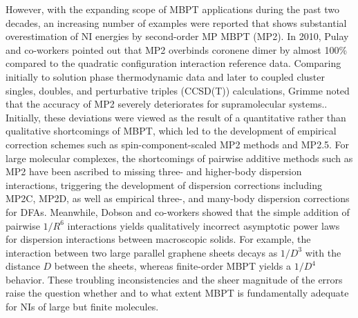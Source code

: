 \documentclass[journal=jctcce,manuscript=article]{achemso}
\begin{document}
However, with the expanding scope of MBPT applications during the past
two decades, an increasing number of examples were reported that shows
substantial overestimation of NI energies by second-order MP MBPT (MP2).\cite{doi:10.1002/wcms.84}
In 2010, Pulay and co-workers pointed out that MP2 overbinds coronene dimer
by almost 100\% compared to the quadratic configuration interaction reference
data.\cite{doi:10.1080/00268970903397249,doi:10.1007/s00214-011-1009-6}
Comparing initially to solution phase thermodynamic
data\cite{Grimme06JComputChem27p1787} and later to coupled cluster singles, doubles,
and perturbative triples (CCSD(T)) calculations,\cite{doi:10.1063/1.3382344}
Grimme noted  that the accuracy of MP2 severely deteriorates for supramolecular
systems.\cite{Grimme12ChemEurJ18p9955}. Initially, these deviations
were viewed as the result of a quantitative rather than qualitative 
shortcomings of MBPT, which led to the development of empirical correction
schemes such as spin-component-scaled MP2 methods\cite{Grimme03JChemPhys118p9095,doi:10.1063/1.1809602}
and MP2.5.\cite{doi:10.1002/cphc.200800718} For large molecular complexes,
the shortcomings of pairwise additive methods such as MP2 have been ascribed
to missing three- and higher-body dispersion interactions,\cite{Grimme12ChemEurJ18p9955}
triggering the development of dispersion corrections including MP2C,
\cite{doi:10.1063/1.2905808,Pitonak10JChemTheoryComput6p168,doi:10.1063/1.4809981}
MP2D,\cite{doi:10.1021/acs.jctc.8b00548,C9SC05689K} as well as
empirical three-\cite{Grimme12ChemEurJ18p9955,Caldeweyher17JChemPhys147p034112},
and many-body\cite{Tkatchenko12PhysRevLett108p236402} dispersion
corrections for DFAs.
Meanwhile, Dobson and co-workers showed
that the simple addition of pairwise $1/R^6$ interactions 
yields qualitatively incorrect asymptotic power laws for dispersion
interactions between macroscopic solids. For example, the interaction
between two large parallel graphene sheets decays as $1/D^3$ with the
distance $D$ between the sheets, whereas finite-order MBPT yields a
$1/D^4$ behavior.\cite{PhysRevLett.96.073201,Lebegue10PhysRevLett105p196401}
These troubling inconsistencies and the sheer magnitude of the errors
raise the question whether and to what extent MBPT is 
fundamentally adequate for NIs of large but finite molecules.
\end{document}
